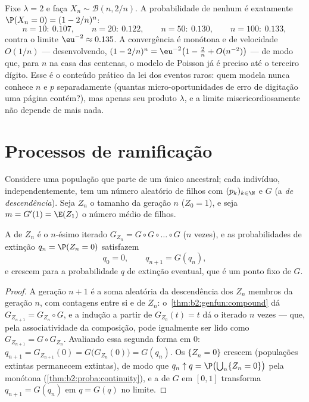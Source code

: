 \begin{example}\label{ex:b2:genfun:poissonnumerics}
Fixe $\lambda = 2$ e faça $X_n \sim \mathcal B(n, 2/n)$. A
probabilidade de nenhum  é exatamente $\P(X_n = 0) = (1 - 2/n)^n$:
\[
n = 10:\ 0.107, \qquad
n = 20:\ 0.122, \qquad
n = 50:\ 0.130, \qquad
n = 100:\ 0.133,
\]
contra o limite $\eu^{-2} \approx 0.135$. A convergência
é monótona e de velocidade $O(1/n)$ --- desenvolvendo, $(1 -
2/n)^n = \eu^{-2}\bigl(1 - \tfrac2n + O(n^{-2})\bigr)$ ---
de modo que, para $n$ na casa das centenas, o modelo de Poisson já é
preciso até o terceiro dígito. Esse é o conteúdo prático
da lei dos eventos raros: quem modela nunca conhece $n$ e
$p$ separadamente (quantas micro-oportunidades de erro de digitação
uma página contém?), mas apenas seu produto $\lambda$, e a
 limite misericordiosamente não depende de mais nada.
\end{example}

\section{Processos de ramificação}

Considere uma população que parte de um único ancestral; cada indivíduo,
independentemente, tem um número aleatório de filhos com  $(p_k)_{k
\in \N}$ e  $G$ (a \emph{
de descendência}). Seja $Z_n$ o tamanho da geração $n$ ($Z_0 =
1$), e seja $m = G'(1) = \E(Z_1)$ o número médio de filhos.

\begin{proposition}\label{prop:b2:genfun:branching}
A  de $Z_n$ é o $n$-ésimo iterado
$G_{Z_n} = G \circ G \circ \dots \circ G$ ($n$ vezes), e as
probabilidades de extinção $q_n = \P(Z_n = 0)$ satisfazem
\[
q_0 = 0, \qquad q_{n+1} = G(q_n),
\]
e crescem para a probabilidade $q$ de extinção eventual, que
é um ponto fixo de $G$.
\end{proposition}

\begin{proof}
A geração $n + 1$ é a soma aleatória da descendência dos $Z_n$
membros da geração $n$, com contagens  entre si
e de $Z_n$: o~\cref{thm:b2:genfun:compound} dá $G_{Z_{n+1}} =
G_{Z_n} \circ G$, e a indução a partir de $G_{Z_0}(t) = t$ dá o
iterado $n$ vezes --- que, pela associatividade da composição, pode
igualmente ser lido como $G_{Z_{n+1}} = G \circ G_{Z_n}$. Avaliando
essa segunda forma em $0$: $q_{n+1} = G_{Z_{n+1}}(0) =
G\bigl(G_{Z_n}(0)\bigr) = G(q_n)$. Os  $\{Z_n = 0\}$ crescem (populações extintas permanecem
extintas), de modo que $q_n \uparrow q = \P\bigl(\bigcup_n\{Z_n = 0\}\bigr)$
pela  monótona (\cref{thm:b2:proba:continuity}), e a
 de $G$ em $[0, 1]$ transforma $q_{n+1} = G(q_n)$ em $q =
G(q)$ no limite.
\end{proof}

